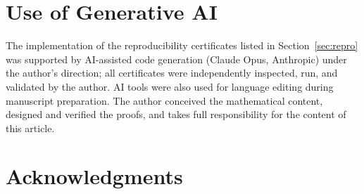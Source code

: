 \documentclass[11pt,a4paper]{article}
\theoremstyle{plain}
\theoremstyle{definition}
\numberwithin{equation}{section}
\begin{document}
\section*{Use of Generative AI}

The implementation of the reproducibility certificates listed in
Section~\ref{sec:repro} was supported by AI-assisted code generation
(Claude Opus, Anthropic) under the author's direction; all certificates
were independently inspected, run, and validated by the author. AI tools
were also used for language editing during manuscript preparation. The
author conceived the mathematical content, designed and verified the
proofs, and takes full responsibility for the content of this article.

\section*{Acknowledgments}
\end{document}
